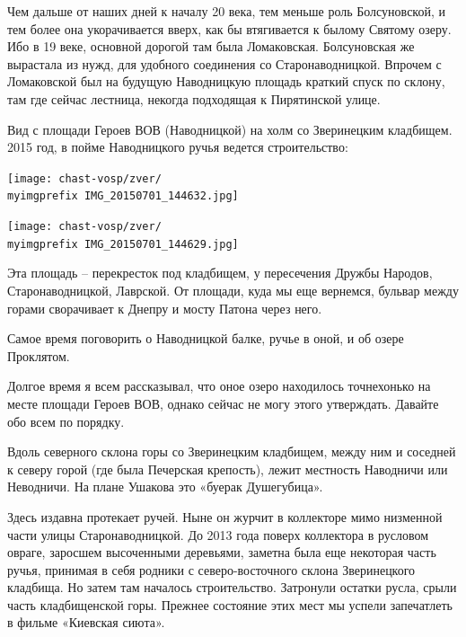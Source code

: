 Чем дальше от наших дней к началу 20 века, тем меньше роль Болсуновской, и тем более она укорачивается вверх, как бы втягивается к былому Святому озеру. Ибо в 19 веке, основной дорогой там была Ломаковская. Болсуновская же вырастала из нужд, для удобного соединения со Старонаводницкой. Впрочем с Ломаковской был на будущую Наводницкую площадь краткий спуск по склону, там где сейчас лестница, некогда подходящая к Пирятинской улице.

Вид с площади Героев ВОВ (Наводницкой) на холм со Зверинецким кладбищем. 2015 год, в пойме Наводницкого ручья ведется строительство:

\begin{center}
\texttt{[image: chast-vosp/zver/\\myimgprefix IMG\_20150701\_144632.jpg]}
\end{center}

\begin{center}
\texttt{[image: chast-vosp/zver/\\myimgprefix IMG\_20150701\_144629.jpg]}
\end{center}

Эта площадь – перекресток под кладбищем, у пересечения Дружбы Народов, Старонаводницкой, Лаврской. От площади, куда мы еще вернемся, бульвар между горами сворачивает к Днепру и мосту Патона через него.

Самое время поговорить о Наводницкой балке, ручье в оной, и об озере Проклятом.

Долгое время я всем рассказывал, что оное озеро находилось точнехонько на месте площади Героев ВОВ, однако сейчас не могу этого утверждать. Давайте обо всем по порядку.

Вдоль северного склона горы со Зверинецким кладбищем, между ним и соседней к северу горой (где была Печерская крепость), лежит местность Наводничи или Неводничи. На плане Ушакова это «буерак Душегубица».

 
Здесь издавна протекает ручей. Ныне он журчит в коллекторе мимо низменной части улицы Старонаводницкой. До 2013 года поверх коллектора в русловом овраге, заросшем высоченными деревьями, заметна была еще некоторая часть ручья, принимая в себя родники с северо-восточного склона Зверинецкого кладбища.  Но затем там началось строительство. Затронули остатки русла, срыли часть кладбищенской горы. Прежнее состояние этих мест мы успели запечатлеть в фильме «Киевская сиюта».

